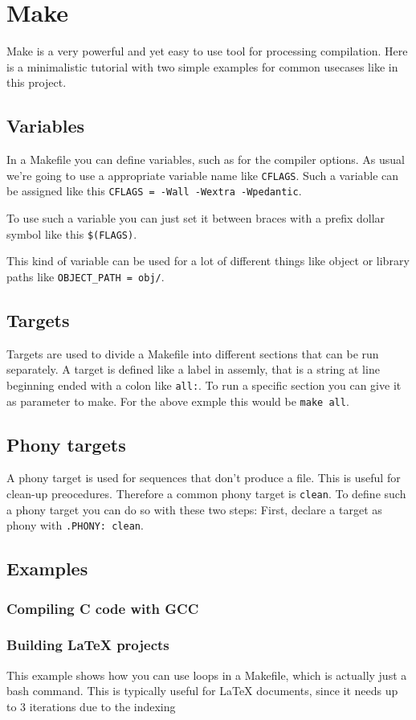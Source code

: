\newpage
\section{Make}
	Make is a very powerful and yet easy to use tool for
	processing compilation. Here is a minimalistic tutorial 
	with two simple examples for common usecases like in this
	project.
	\subsection{Variables}
		In a Makefile you can define variables, such as
		for the compiler options. As usual we're going to
		use a appropriate variable name like 
		\lstinline{CFLAGS}. Such a variable can be 
		assigned like this
		\lstinline{CFLAGS = -Wall -Wextra -Wpedantic}.

		To use such a variable you can just set it between
		braces with a prefix dollar symbol like this
		\lstinline{$(FLAGS)}. %

		This kind of variable can be used for a lot of
		different things like object or library paths
		like \lstinline{OBJECT_PATH = obj/}.

	\subsection{Targets}
		Targets are used to divide a Makefile into different
		sections that can be run separately. A target is
		defined like a label in assemly, that is a string
		at line beginning ended with a colon like 
		\lstinline{all:}. To run a specific section you can 
		give it as parameter to make. For the above exmple
		this would be \lstinline{make all}.

	\subsection{Phony targets}
		A phony target is used for sequences that don't
		produce a file. This is useful for clean-up 
		preocedures. Therefore a common phony target is
		\lstinline{clean}. To define such a phony target
		you can do so with these two steps: First, declare
		a target as phony with \lstinline{.PHONY: clean}.

	\newpage
	\subsection{Examples}
		\subsubsection{Compiling C code with GCC}
			
	
		\subsubsection{Building LaTeX projects}
			This example shows how you can use loops in a
			Makefile, which is actually just a bash command.
			This is typically useful for LaTeX documents,
			since it needs up to 3 iterations due to the
			indexing
			
